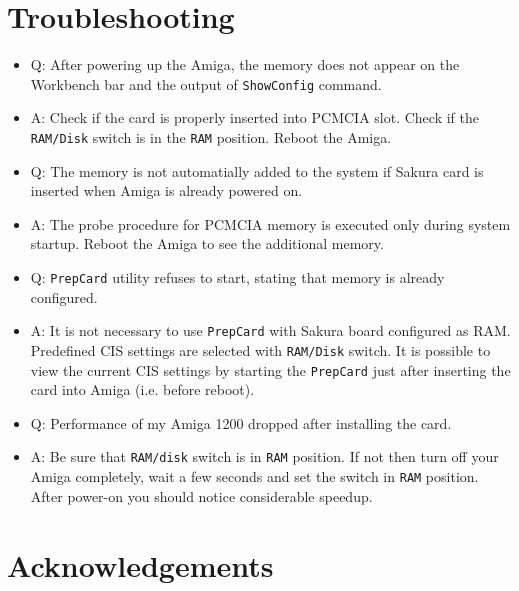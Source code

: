\documentclass[10pt,a5paper]{article}
\begin{document}
\section*{Troubleshooting}

\begin{itemize}
	\item Q: After powering up the Amiga, the memory does not appear on the Workbench bar and the output of {\tt ShowConfig} command.
	\item A: Check if the card is properly inserted into PCMCIA slot. Check if the {\tt RAM/Disk} switch is in the {\tt RAM} position. Reboot the Amiga.
\end{itemize}

\begin{itemize}
	\item Q: The memory is not automatially added to the system if Sakura card is inserted when Amiga is already powered on. 
	\item A: The probe procedure for PCMCIA memory is executed only during system startup. Reboot the Amiga to see the additional memory. 
\end{itemize}

\begin{itemize}
	\item Q: {\tt PrepCard} utility refuses to start, stating that memory is already configured. 
	\item A: It is not necessary to use {\tt PrepCard} with Sakura board configured as RAM. Predefined CIS settings are selected with {\tt RAM/Disk} switch. It is possible to view the current CIS settings by starting the {\tt PrepCard} just after inserting the card into Amiga (i.e. before reboot). 
\end{itemize}

\begin{itemize}
	\item Q: Performance of my Amiga 1200 dropped after installing the card.
	\item A: Be sure that {\tt RAM/disk} switch is in {\tt RAM} position. If not then turn off your Amiga completely, wait a few seconds and set the switch in {\tt RAM} position. After power-on you should notice considerable speedup.
\end{itemize}

\section*{Acknowledgements}
\end{document}
